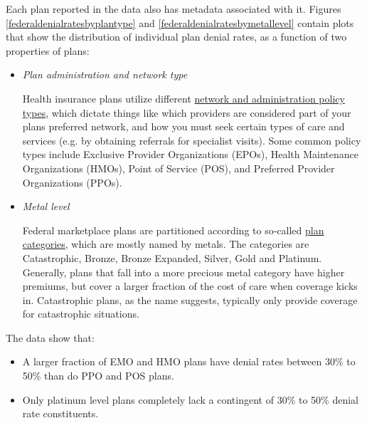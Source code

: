 \documentclass[12pt, a4paper,twoside,parskip=full]{report}
\theoremstyle{plain} %
\theoremstyle{definition} %
\theoremstyle{remark} %
\numberwithin{equation}{chapter}
\begin{document}
		\clearpage
	
	
		Each plan reported in the data also has metadata associated with it. Figures \ref{federaldenialratesbyplantype} and \ref{federaldenialratesbymetallevel} contain plots that show the distribution of individual plan denial rates, as a function of two properties of plans:
		
		\begin{itemize}
			\item \emph{Plan administration and network type}
			
				Health insurance plans utilize different \href{https://www.healthcare.gov/choose-a-plan/plan-types/}{network and administration policy types}, which dictate things like which providers are considered part of your plans preferred network, and how you must seek certain types of care and services (e.g. by obtaining referrals for specialist visits). Some common policy types include Exclusive Provider Organizations (EPOs), Health Maintenance Organizations (HMOs), Point of Service (POS), and Preferred Provider Organizations (PPOs).
			
			\item \emph{Metal level}
			
			
				Federal marketplace plans are partitioned according to so-called \href{https://www.healthcare.gov/choose-a-plan/plans-categories/}{plan categories}, which are mostly named by metals. The categories are Catastrophic, Bronze, Bronze Expanded, Silver, Gold and Platinum. Generally, plans that fall into a more precious metal category have higher premiums, but cover a larger fraction of the cost of care when coverage kicks in. Catastrophic plans, as the name suggests, typically only provide coverage for catastrophic situations.
		\end{itemize}
	
		The data show that:
		
		\begin{itemize}
			\item A larger fraction of EMO and HMO plans have denial rates between 30\% to 50\% than do PPO and POS plans.
			\item Only platinum level plans completely lack a contingent of 30\% to 50\% denial rate constituents.
		\end{itemize}
	
\end{document}

